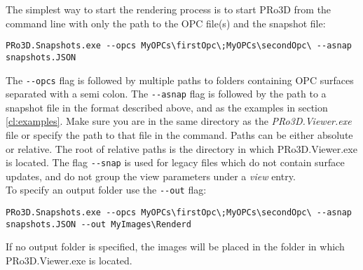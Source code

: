 The simplest way to start the rendering process is to start PRo3D from the command line with only the path to the OPC file(s) and the snapshot file:

\begin{lstlisting}
PRo3D.Snapshots.exe --opcs MyOPCs\firstOpc\;MyOPCs\secondOpc\ --asnap snapshots.JSON
\end{lstlisting}

The \texttt{-{}-opcs} flag is followed by multiple paths to folders containing OPC surfaces separated with a semi colon. The \texttt{-{}-asnap} flag is followed by the path to a snapshot file in the format described above, and as the examples in section \ref{cl:examples}. Make sure you are in the same directory as the \emph{PRo3D.Viewer.exe} file or specify the path to that file in the command. Paths can be either absolute or relative. The root of relative paths is the directory in which PRo3D.Viewer.exe is located. The flag \texttt{-{}-snap} is used for legacy files which do not contain surface updates, and do not group the view parameters under a \emph{view} entry.\\

To specify an output folder use the \texttt{-{}-out} flag:

\begin{lstlisting}
PRo3D.Snapshots.exe --opcs MyOPCs\firstOpc\;MyOPCs\secondOpc\ --asnap snapshots.JSON --out MyImages\Renderd
\end{lstlisting}

If no output folder is specified, the images will be placed in the folder in which PRo3D.Viewer.exe is located. 

